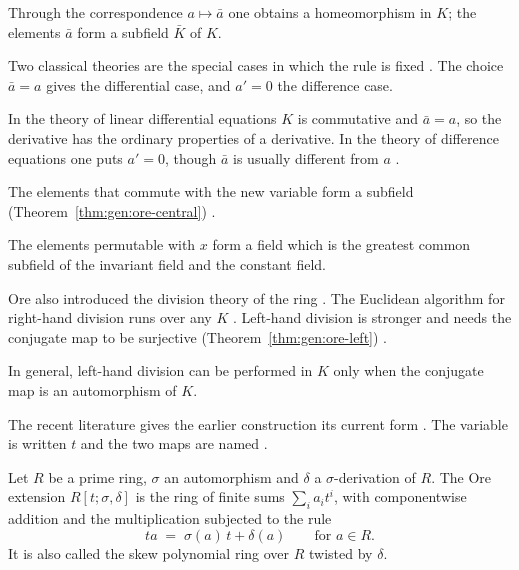 \begin{theorem}\label{thm:gen:ore-conjugate}
Through the correspondence $a\mapsto\bar a$ one obtains a homeomorphism in
$K$; the elements $\bar a$ form a subfield $\bar K$ of $K$.
\end{theorem}

Two classical theories are the special cases in which the rule is fixed
\cite[p.~482]{Ore1933}. The choice $\bar a=a$ gives the differential case, and
$a'=0$ the difference case.

\begin{remark}\label{rem:gen:ore-two-cases}
In the theory of linear differential equations $K$ is commutative and
$\bar a=a$, so the derivative has the ordinary properties of a derivative. In
the theory of difference equations one puts $a'=0$, though $\bar a$ is usually
different from $a$ \cite[p.~482]{Ore1933}.
\end{remark}

The elements that commute with the new variable form a subfield (Theorem~\ref{thm:gen:ore-central})
\cite[p.~483]{Ore1933}.\begin{theorem}\label{thm:gen:ore-central}
The elements permutable with $x$ form a field which is the greatest common
subfield of the invariant field and the constant field.
\end{theorem}

Ore also introduced the division theory of the ring
\cite[p.~484]{Ore1933}. The Euclidean algorithm
for right-hand division runs over any $K$ \cite[p.~484]{Ore1933}. Left-hand
division is stronger and needs the conjugate map to be surjective (Theorem~\ref{thm:gen:ore-left})
\cite[Theorem~6, p.~497]{Ore1933}.\begin{theorem}\label{thm:gen:ore-left}
In general, left-hand division can be performed in $K$ only when the
conjugate map is an automorphism of $K$.
\end{theorem}

The recent literature gives the earlier construction its current form
\cite[p.~2838]{Chuang2017Auto}. The variable is written $t$ and the two maps
are named \cite[p.~2838]{Chuang2017Auto}.

\begin{definition}\label{def:gen:ore-extension}
Let $R$ be a prime ring, $\sigma$ an automorphism and $\delta$ a
$\sigma$-derivation of $R$. The Ore extension $R[t;\sigma,\delta]$ is the ring
of finite sums $\sum_i a_i t^i$, with componentwise addition and the
multiplication subjected to the rule
\begin{equation*}
t a \;=\; \sigma(a)\, t + \delta(a) \qquad\text{for } a\in R.
\end{equation*}
It is also called the skew polynomial ring over $R$ twisted by $\delta$.
\end{definition}

